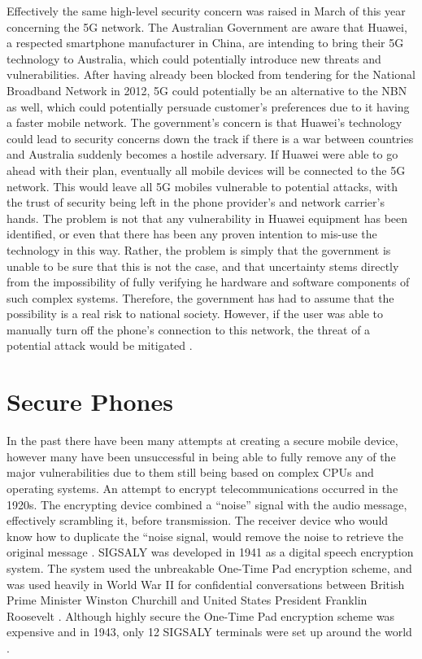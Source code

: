 	Effectively the same high-level security concern was raised in March of this year concerning the 5G network. The Australian Government are aware that Huawei, a respected smartphone manufacturer in China, are intending to bring their 5G technology to Australia, which could potentially introduce new threats and vulnerabilities. After having already been blocked from tendering for the National Broadband Network in 2012, 5G could potentially be an alternative to the NBN as well, which could potentially persuade customer’s preferences due to it having a faster mobile network. 
	The government’s concern is that Huawei’s technology could lead to security concerns down the track if there is a war between countries and Australia suddenly becomes a hostile adversary. If Huawei were able to go ahead with their plan, eventually all mobile devices will be connected to the 5G network. This would leave all 5G mobiles vulnerable to potential attacks, with the trust of security being left in the phone provider’s and network carrier’s hands. The problem is not that any vulnerability in Huawei equipment has been identified, or even that there has been any proven intention to mis-use the technology in this way. Rather, the problem is simply that the government is unable to be sure that this is not the case, and that uncertainty stems directly from the impossibility of fully verifying he hardware and software components of such complex systems. Therefore, the government has had to assume that the possibility is a real risk to national society.
However, if the user was able to manually turn off the phone’s connection to this network, the threat of a potential attack would be mitigated \cite{RN14}.


\section{Secure Phones}

	In the past there have been many attempts at creating a secure mobile device, however many have been unsuccessful in being able to fully remove any of the major vulnerabilities due to them still being based on complex CPUs and operating systems. 
	An attempt to encrypt telecommunications occurred in the 1920s. The encrypting device combined a “noise” signal with the audio message, effectively scrambling it, before transmission. The receiver device who would know how to duplicate the “noise signal, would remove the noise to retrieve the original message \cite{RN30}.
	SIGSALY was developed in 1941 as a digital speech encryption system. The system used the unbreakable One-Time Pad encryption scheme, and was used heavily in World War II for confidential conversations between British Prime Minister Winston Churchill and United States President Franklin Roosevelt \cite{RN21}. Although highly secure the One-Time Pad encryption scheme was expensive and in 1943, only 12 SIGSALY terminals were set up around the world \cite{RN21}.

